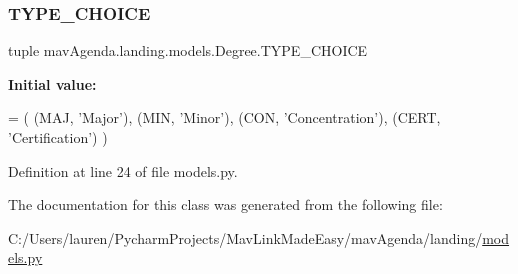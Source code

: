\subsubsection{\texorpdfstring{T\+Y\+P\+E\+\_\+\+C\+H\+O\+I\+CE}{TYPE\_CHOICE}}
{\footnotesize\ttfamily tuple mav\+Agenda.\+landing.\+models.\+Degree.\+T\+Y\+P\+E\+\_\+\+C\+H\+O\+I\+CE\hspace{0.3cm}{\ttfamily [static]}}

{\bfseries Initial value\+:}
\begin{DoxyCode}
=  (
        (MAJ, \textcolor{stringliteral}{'Major'}),
        (MIN, \textcolor{stringliteral}{'Minor'}),
        (CON, \textcolor{stringliteral}{'Concentration'}),
        (CERT, \textcolor{stringliteral}{'Certification'})
    )
\end{DoxyCode}


Definition at line 24 of file models.\+py.



The documentation for this class was generated from the following file\+:\begin{DoxyCompactItemize}
\item 
C\+:/\+Users/lauren/\+Pycharm\+Projects/\+Mav\+Link\+Made\+Easy/mav\+Agenda/landing/\mbox{\hyperlink{models_8py}{models.\+py}}\end{DoxyCompactItemize}
